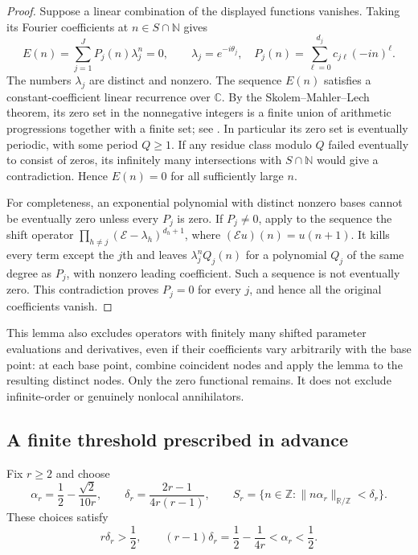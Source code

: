 \documentclass[11pt,letterpaper]{article}
\theoremstyle{definition}
\theoremstyle{remark}
\newcommand{\1}{\mathbf 1}
\begin{document}
\begin{proof}
Suppose a linear combination of the displayed functions vanishes.
Taking its Fourier coefficients at $n\in S\cap\mathbb N$ gives
\[
 E(n)=\sum_{j=1}^J P_j(n)\lambda_j^n=0,
 \qquad
 \lambda_j=e^{-i\theta_j},\quad
 P_j(n)=\sum_{\ell=0}^{d_j}c_{j\ell}(-in)^\ell.
\]
The numbers $\lambda_j$ are distinct and nonzero.  The sequence $E(n)$
satisfies a constant-coefficient linear recurrence over $\mathbb C$.
By the Skolem--Mahler--Lech theorem, its zero set in the nonnegative
integers is a finite union of arithmetic progressions together with
a finite set; see \cite[Theorem~1.3]{BellLagarias2015}.
In particular its zero set is eventually periodic, with some period
$Q\ge1$.  If any residue class modulo $Q$ failed eventually to consist
of zeros, its infinitely many intersections with $S\cap\mathbb N$
would give a contradiction.  Hence $E(n)=0$ for all sufficiently large
$n$.

For completeness, an exponential polynomial with distinct nonzero bases
cannot be eventually zero unless every $P_j$ is zero.  If $P_j\ne0$,
apply to the sequence the shift operator
$\prod_{h\ne j}(\mathcal E-\lambda_h)^{d_h+1}$, where
$(\mathcal E u)(n)=u(n+1)$.  It kills every term except the $j$th and
leaves $\lambda_j^n Q_j(n)$ for a polynomial $Q_j$ of the same degree
as $P_j$, with nonzero leading coefficient.  Such a sequence is not
eventually zero.  This contradiction proves $P_j=0$ for every $j$,
and hence all the original coefficients vanish.
\end{proof}

This lemma also excludes operators with finitely many shifted parameter
evaluations and derivatives, even if their coefficients vary arbitrarily
with the base point: at each base point, combine coincident nodes and
apply the lemma to the resulting distinct nodes.  Only the zero
functional remains.  It does not exclude infinite-order or genuinely
nonlocal annihilators.

\subsection{A finite threshold prescribed in advance}

Fix $r\ge2$ and choose
\begin{equation}\label{p10:eq:Bohr-parameters}
 \alpha_r=\frac12-\frac{\sqrt2}{10r},\qquad
 \delta_r=\frac{2r-1}{4r(r-1)},\qquad
 S_r=\{n\in\mathbb Z:\|n\alpha_r\|_{\mathbb R/\mathbb Z}<\delta_r\}.
\end{equation}
These choices satisfy
\begin{equation}\label{p10:eq:Bohr-inequalities}
 r\delta_r>\frac12,
 \qquad
 (r-1)\delta_r=\frac12-\frac1{4r}<\alpha_r<\frac12.
\end{equation}
\end{document}
